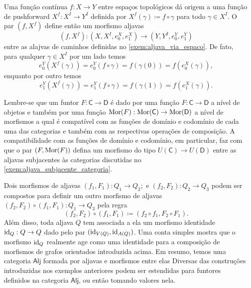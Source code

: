\begin{exem}
    Uma função contínua $f: X \to Y$ entre espaços topológicos dá origem a uma função de pushforward $X^f: X^I \to Y^{I}$ definida por $X^f(\gamma) \coloneqq f \circ \gamma$ para todo $\gamma \in X^{I}$.
    O par $(f,X^f)$ define então um morfismo aljavas
    \begin{displaymath}
        (f,X^f): (X,X^I,e^X_0,e^X_1) \to (Y,Y^I,e^Y_0,e^Y_1)
    \end{displaymath}
    entre as alajvas de caminhos definidas no \cref{exem:aljava_via_espaco}.
    De fato, para qualquer $\gamma \in X^I$ por um lado temos
    \begin{displaymath}
        e^Y_0(X^f(\gamma)) = e^Y_0(f \circ \gamma) = f(\gamma(0)) = f(e^X_0(\gamma)),
    \end{displaymath}
    enquanto por outro temos
    \begin{displaymath}
        e^Y_1(X^f(\gamma)) = e^Y_1(f \circ \gamma) = f(\gamma(1)) = f(e^X_1(\gamma)).
    \end{displaymath}
\end{exem}

\begin{exem}\label{exem:funtor_induz_morfismo_de_aljavas}
    Lembre-se que um funtor $F: \mathsf{C} \to \mathsf{D}$ é dado por uma função $F: \mathsf{C} \to \mathsf{D}$ a nível de objetos e também por uma função $\mathrm{Mor}(F): \mathrm{Mor}(\mathsf{C}) \to \mathrm{Mor}(\mathsf{D})$ a nível de morfismos a qual é compatível com as funções de domínio e codomínio de cada uma das categorias e também com as respectivas operações de composição.
    A compatibilidade com as funções de domínio e codomínio, em particular, faz com que o par $(F,\mathrm{Mor}(F))$ defina um morfismo do tipo $U(\mathsf{C}) \to U(\mathsf{D})$ entre as aljavas subjacentes às categorias discutidas no \cref{exem:aljava_subjacente_categoria}.
\end{exem}

Dois morfismos de aljavas $(f_1,F_1): Q_1 \to Q_2;$ e $(f_2,F_2): Q_2 \to Q_3$ podem ser compostos para definir um outro morfismo de aljavas $(f_2,F_2) \circ (f_1,F_1): Q_1 \to Q_3$ pela regra
\begin{displaymath}
    (f_2,F_2) \circ (f_1,F_1) \coloneqq (f_2 \circ f_1,F_2 \circ F_1).
\end{displaymath}
Além disso, toda aljava $Q$ tem associada a ela um morfismo identidade $\mathrm{id}_Q: Q \to Q$ dado pelo par $(\mathrm{id}_{V(Q)},\mathrm{id}_{A(Q)})$.
Uma conta simples mostra que o morfismo $\mathrm{id}_Q$ realmente age como uma identidade para a composição de morfismos de grafos orientados introduzida acima.
Em resumo, temos uma categoria $\mathsf{Alj}$ formada por aljavas e morfismos entre elas
Diversas das construções introduzidas nos exemplos anteriores podem ser estendidas para funtores definidos na categoria $\mathsf{Alj}$, ou então tomando valores nela.

